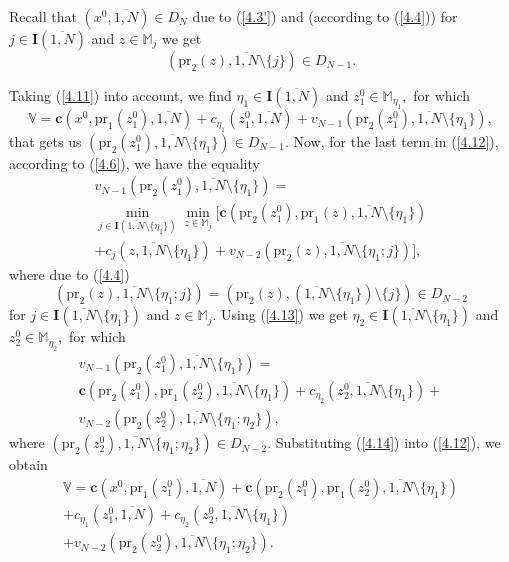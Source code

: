 \documentclass[numbers,sort&compress]{IntechOpen-Book}%
\begin{document}
Recall that
$(x^0,\overline{1,N}) \in D_N$
due to  (\ref{4.3'})
and
(according to  (\ref{4.4}))
for
$j \in \mathbf{I}(\overline{1,N})$
and
$z \in \mathbb{M}_j$
we get
$$
  (\mathrm{pr}_2(z),\overline{1,N} \setminus \{j\}) \in D_{N-1}
  .
$$

Taking  (\ref{4.11}) into account, we find
$\eta_1 \in \mathbf{I}(\overline{1,N})$ and $z_1^0 \in \mathbb{M}_{\eta_1},$
for which
\begin{equation}\label{4.12}
  \mathbb{V} = \mathbf{c}(x^0,\mathrm{pr}_1(z_1^0),\overline{1,N}) +
  c_{\eta_1}(z_1^0,\overline{1,N}) +
  v_{N-1}(\mathrm{pr}_2(z_1^0),\overline{1,N} \setminus \{\eta_1\}),
\end{equation}
that gets us
$(\mathrm{pr}_2(z_1^0),\overline{1,N} \setminus \{\eta_1\}) \in D_{N-1}$.
Now,
for the last term in  (\ref{4.12}),
according to  (\ref{4.6}),
we have the equality
\begin{multline}
  \label{4.13}
  v_{N-1}(\mathrm{pr}_2(z_1^0),\overline{1,N}  \setminus \{\eta_1\}) =
  \\
  \min\limits_{j \in \mathbf{I}(\overline{1,N} \setminus \{\eta_1\})}
  \min\limits_{z \in \mathbb{M}_j}
  \big [
    \mathbf{c}(\mathrm{pr}_2(z_1^0),\mathrm{pr}_1(z),\overline{1,N} \setminus \{\eta_1\})
    \\
    + c_j(z,\overline{1,N} \setminus \{\eta_1\}) +
    v_{N-2}(\mathrm{pr}_2(z),\overline{1,N} \setminus \{\eta_1;j\})
  \big ],
\end{multline}
where due to
 (\ref{4.4})
$$
(\mathrm{pr}_2(z),\overline{1,N} \setminus \{\eta_1;j\}) =
(\mathrm{pr}_2(z),(\overline{1,N} \setminus \{\eta_1\}) \setminus \{j\}) \in D_{N-2}
$$
for
$j \in \mathbf{I}(\overline{1,N} \setminus \{\eta_1\})$ and $z \in \mathbb{M}_j.$
Using  (\ref{4.13})
we get
$\eta_2 \in \mathbf{I}(\overline{1,N} \setminus \{\eta_1\})$ and $z_2^0 \in \mathbb{M}_{\eta_2},$
for which
\begin{multline}
  \label{4.14}
  v_{N-1}(\mathrm{pr}_2(z_1^0),\overline{1,N} \setminus \{\eta_1\}) =
  \\
  \mathbf{c}(\mathrm{pr}_2(z_1^0),\mathrm{pr}_1(z_2^0),\overline{1,N}
  \setminus \{\eta_1\}) + c_{\eta_2}(z_2^0,\overline{1,N}
  \setminus \{\eta_1\})
  + \\
  v_{N-2}(\mathrm{pr}_2(z_2^0),\overline{1,N} \setminus
  \{\eta_1;\eta_2\}),
\end{multline}
where
$(\mathrm{pr}_2(z_2^0),\overline{1,N} \setminus \{\eta_1;\eta_2\}) \in D_{N-2}.$
Substituting  (\ref{4.14}) into  (\ref{4.12}), we obtain
\begin{equation}\label{4.15}
  \begin{array}{c}
    \mathbb{V} =
    \mathbf{c}(x^0,\mathrm{pr}_1(z_1^0),\overline{1,N}) +
    \mathbf{c}(\mathrm{pr}_2(z_1^0),\mathrm{pr}_1(z_2^0),\overline{1,N} \setminus \{\eta_1\})\\
    + c_{\eta_1}(z_1^0,\overline{1,N}) + c_{\eta_2}(z_2^0,\overline{1,N} \setminus \{\eta_1\})
    \\
    + v_{N-2}(\mathrm{pr}_2(z_2^0),\overline{1,N} \setminus \{\eta_1;\eta_2\}).
  \end{array}
\end{equation}
\end{document}
